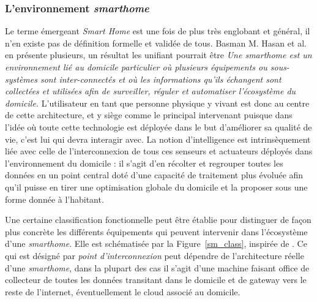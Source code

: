 \documentclass[]{article}
\begin{document}
\newpage

\subsubsection{L'environnement \textit{smarthome}}
\par Le terme émergeant \textit{Smart Home} est une fois de plus très englobant et général, il n'en existe pas de définition formelle et validée de tous. Basman M. Hasan et al. \cite{Basman2016} en présente plusieurs, un résultat les unifiant pourrait être \textit{Une smarthome est un environnement lié au domicile particulier où plusieurs équipements ou sous-systèmes sont inter-connectés et où les informations qu'ils échangent sont collectées et utilisées afin de surveiller, réguler et automatiser l'écosystème du domicile.} L'utilisateur en tant que personne physique y vivant est donc au centre de cette architecture, et y siège comme le principal intervenant puisque dans l'idée où toute cette technologie est déployée dans le but d'améliorer sa qualité de vie, c'est lui qui devra interagir avec. La notion d'intelligence est intrinsèquement liée avec celle de l'interconnexion de tous ces senseurs et actuateurs déployés dans l'environnement du domicile : il s'agit d'en récolter et regrouper toutes les données en un point central doté d'une capacité de traitement plus évoluée afin qu'il puisse en tirer une optimisation globale du domicile et la proposer sous une forme donnée à l'habitant.\\

\par Une certaine classification fonctionnelle peut être établie pour distinguer de façon plus concrète les différents équipements qui peuvent intervenir dans l'écosystème d'une \textit{smarthome}. Elle est schématisée par la Figure~\ref{sm_class}, inspirée de \cite{Basman2016}. Ce qui est désigné par \textit{point d'interconnexion} peut dépendre de l'architecture réelle d'une \textit{smarthome}, dans la plupart des cas il s'agit d'une machine faisant office de collecteur de toutes les données transitant dans le domicile et de gateway vers le reste de l'internet, éventuellement le cloud associé au domicile.\\
\end{document}

